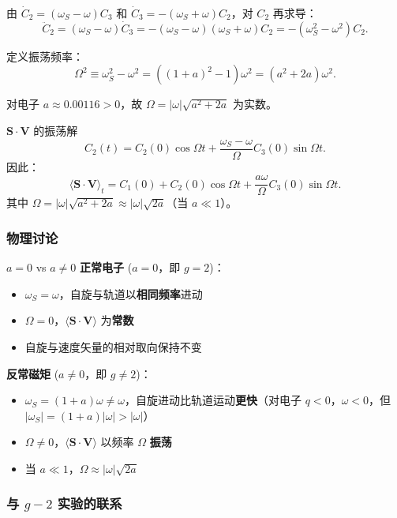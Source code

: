 由 $\dot C_2=(\omega_S-\omega)C_3$ 和 $\dot C_3=-(\omega_S+\omega)C_2$，对 $C_2$ 再求导：
\[
  \ddot C_2 = (\omega_S-\omega)\dot C_3 = -(\omega_S-\omega)(\omega_S+\omega)C_2
  = -(\omega_S^2-\omega^2)C_2.
\]

定义振荡频率：
\[
  \Omega^2 \equiv \omega_S^2-\omega^2 = ((1+a)^2-1)\omega^2 = (a^2+2a)\omega^2.
\]

对电子 $a\approx 0.00116>0$，故 $\Omega=|\omega|\sqrt{a^2+2a}$ 为实数。

\begin{formulabox}{$\bm S\cdot\bm V$ 的振荡解}
\[
  C_2(t) = C_2(0)\cos\Omega t + \frac{\omega_S-\omega}{\Omega}C_3(0)\sin\Omega t.
\]
因此：
\[
  \boxed{\langle\bm S\cdot\bm V\rangle_t = C_1(0) + C_2(0)\cos\Omega t + \frac{a\omega}{\Omega}C_3(0)\sin\Omega t}.
\]
其中 $\Omega=|\omega|\sqrt{a^2+2a}\approx|\omega|\sqrt{2a}$（当 $a\ll 1$）。
\end{formulabox}

\subsubsection{物理讨论}

\begin{insightbox}{$a=0$ vs $a\neq 0$}
\textbf{正常电子} ($a=0$，即 $g=2$)：
\begin{itemize}[nosep]
  \item $\omega_S=\omega$，自旋与轨道以\textbf{相同频率}进动
  \item $\Omega=0$，$\langle\bm S\cdot\bm V\rangle$ 为\textbf{常数}
  \item 自旋与速度矢量的相对取向保持不变
\end{itemize}

\textbf{反常磁矩} ($a\neq 0$，即 $g\neq 2$)：
\begin{itemize}[nosep]
  \item $\omega_S=(1+a)\omega\neq\omega$，自旋进动比轨道运动\textbf{更快}（对电子 $q<0$，$\omega<0$，但 $|\omega_S|=(1+a)|\omega|>|\omega|$）
  \item $\Omega\neq 0$，$\langle\bm S\cdot\bm V\rangle$ 以频率 $\Omega$ \textbf{振荡}
  \item 当 $a\ll 1$，$\Omega\approx|\omega|\sqrt{2a}$
\end{itemize}
\end{insightbox}

\subsubsection{与 $g-2$ 实验的联系}

